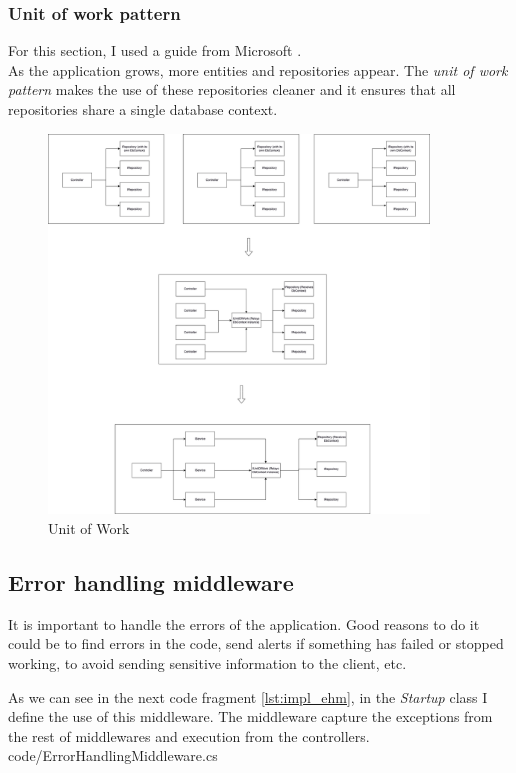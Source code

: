         \subsubsection{Unit of work pattern}
            {For this section, I used a guide from Microsoft \cite{RepoAndUW}.}\\
            As the application grows, more entities and repositories appear. The \textit{unit of work pattern} 
            makes the use of these repositories cleaner and it ensures that all repositories share a single database context.

            \begin{figure}[H]
                \centering
                    \includegraphics[width=0.9\textwidth]{assets/diagrams/unitofwork.png}
                \caption{Unit of Work}
                \label{fig:implementation_unit_work}
            \end{figure}
    
    \subsection{Error handling middleware}
        It is important to handle the errors of the application. Good reasons to do it could be to find errors in the code, 
        send alerts if something has failed or stopped working, to avoid sending sensitive information to the client, etc.

        As we can see in the next code fragment \ref{lst:impl_ehm}, in the \textit{Startup} class I define the use of this middleware.
        The middleware capture the exceptions from the rest of middlewares and execution from the controllers. \\
        
        {code/ErrorHandlingMiddleware.cs}

